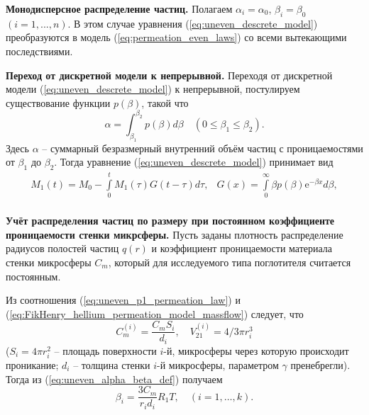 \textbf{Монодисперсное распределение частиц.}
Полагаем $\alpha_i=\alpha_0$, $\beta_i=\beta_0$ $(i=1,...,n)$. В этом случае уравнения (\ref{eq:uneven_descrete_model}) преобразуются в модель (\ref{eq:permeation_even_laws}) со всеми вытекающими последствиями.

\textbf{Переход от дискретной модели к непрерывной.}
Переходя от дискретной модели (\ref{eq:uneven_descrete_model}) к непрерывной, постулируем существование функции $p(\beta)$, такой что 
\begin{equation}
\label{eq:uneven_pbeta_def}
\alpha = \int_{\beta_1}^{\beta_2} p(\beta) d\beta\quad
(0 \leq \beta_1 \leq \beta_2).
\end{equation}
Здесь $\alpha$ -- суммарный безразмерный внутренний объём частиц с проницаемостями от $\beta_1$ до $\beta_2$. Тогда уравнение (\ref{eq:uneven_descrete_model}) принимает вид
\begin{equation}
\label{eq:uneven_cont_model}
\begin{array}{rl}
M_1(t)=M_0-\int\limits_{0}^{t}  M_1(\tau)  G(t-\tau) d\tau, & 
G(x) = \int\limits_{0}^{\infty}\beta p(\beta)  \mathrm{e}^{-\beta x} d\beta,\\
\end{array}
\end{equation}


\textbf{Учёт распределения частиц по размеру при постоянном коэффициенте проницаемости стенки микрсферы.}
Пусть заданы плотность распределение радиусов полостей частиц $q(r)$ и коэффициент проницаемости материала стенки микросферы $C_m$, который для исследуемого типа поглотителя считается постоянным.

Из соотношения (\ref{eq:uneven_p1_permeation_law}) и (\ref{eq:FikHenry_hellium_permeation_model_massflow}) следует, что
\begin{equation*}
\label{eq:uneven_Cmi_V21i_def}
C_m^{(i)} = \frac{C_m S_i}{d_i}, \quad V_{21}^{(i)} = 4/3\pi r_i^3
\end{equation*}
($S_i=4 \pi r_i^2$ -- площадь поверхности $i$-й, микросферы через которую происходит проникание; $d_i$ -- толщина стенки $i$-й микросферы, параметром $\gamma$ пренебрегли). Тогда из (\ref{eq:uneven_alpha_beta_def}) получаем
\begin{equation}
\label{eq:uneven_beta_reduction}
\beta_i = \frac{3 C_m}{r_i d_i} R_1 T, \quad (i=1,\ldots, k).
\end{equation}

